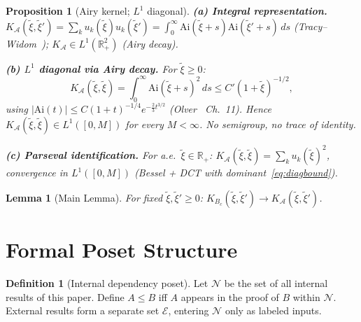 \documentclass[12pt,a4paper]{amsart}
\newtheorem{lemma}[theorem]{Lemma}
\newtheorem{proposition}[theorem]{Proposition}
\theoremstyle{definition}
\newtheorem{definition}[theorem]{Definition}
\newcommand{\cA}{\mathcal{A}}
\newcommand{\R}{\mathbb{R}}
\newcommand{\cK}{K_{B_c}}
\newcommand{\cKA}{K_{\cA}}
\newcommand{\Ai}{\mathrm{Ai}}
\newcommand{\xit}{\tilde{\xi}}
\begin{document}
\begin{proposition}[Airy kernel; $L^1$ diagonal]
\label{prop:kernelbridge}
\textbf{(a) Integral representation.}
$\cKA(\xit,\xit')
=\sum_k u_k(\xit)u_k(\xit')
=\int_0^\infty\Ai(\xit+s)\Ai(\xit'+s)\,ds$
(Tracy--Widom~\cite{TracyWidom1994});
$\cKA\in L^1(\R_+^2)$ (Airy decay).

\medskip
\textbf{(b) $L^1$ diagonal via Airy decay.}
For $\xit\geq 0$:
\begin{equation}\label{eq:diagbound}
  \cKA(\xit,\xit)
  =\int_0^\infty\Ai(\xit+s)^2\,ds
  \leq C'(1+\xit)^{-1/2},
\end{equation}
using $|\Ai(t)|\leq C(1+t)^{-1/4}e^{-\frac{2}{3}t^{3/2}}$
(Olver~\cite{Olver1997} Ch.~11).
Hence $\cKA(\xit,\xit)\in L^1([0,M])$ for every $M<\infty$.
\emph{No semigroup, no trace of identity.}

\medskip
\textbf{(c) Parseval identification.}
For a.e.\ $\xit\in\R_+$:
$\cKA(\xit,\xit)=\sum_k u_k(\xit)^2$,
convergence in $L^1([0,M])$
(Bessel + DCT with dominant~\eqref{eq:diagbound}).
\end{proposition}

\begin{lemma}[Main Lemma]\label{lem:main}
For fixed $\xit,\xit'\geq 0$:
$\cK(\xit,\xit')\to\cKA(\xit,\xit')$.
\end{lemma}

\section{Formal Poset Structure}
\label{sec:depgraph}

\begin{definition}[Internal dependency poset]
\label{def:poset}
Let $\mathcal{N}$ be the set of all internal results of this paper.
Define $A\leq B$ iff $A$ appears in the proof of $B$ within
$\mathcal{N}$.
External results form a separate set $\mathcal{E}$,
entering $\mathcal{N}$ only as labeled inputs.
\end{definition}
\end{document}
